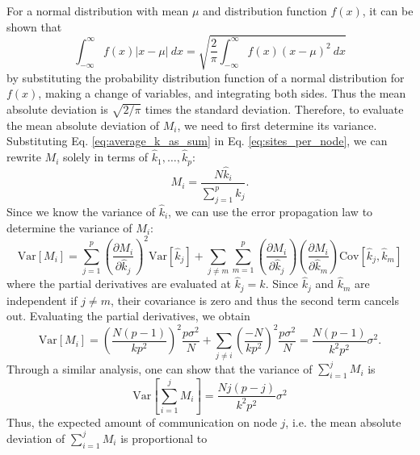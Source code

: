 \documentclass[11pt]{article}
\begin{document}
For a normal distribution with mean $\mu$ and distribution function
$f(x)$, it can be shown that
\begin{equation}
  \int_{-\infty}^{\infty} f(x) \left | x - \mu \right | \: dx =
  \sqrt{\frac{2}{\pi} \int_{-\infty}^{\infty} f(x) \left ( x - \mu
    \right )^2 \: dx}
\end{equation}
by substituting the probability distribution function of a normal
distribution for $f(x)$, making a change of variables, and integrating
both sides. Thus the mean absolute deviation is $\sqrt{2/\pi}$ times
the standard deviation. Therefore, to evaluate the mean absolute
deviation of $M_i$, we need to first determine its
variance. Substituting Eq. \ref{eq:average_k_as_sum} in
Eq. \ref{eq:sites_per_node}, we can rewrite $M_i$ solely in terms of
$\hat{k}_1, \dots, \hat{k}_p$:
\begin{equation}
  M_i = \frac{N \hat{k}_i}{\sum\limits_{j=1}^p \hat{k}_j}.
\end{equation}
Since we know the variance of $\hat{k}_i$, we can use the error
propagation law to determine the variance of $M_i$:
\begin{equation}
  \text{Var} \left [ M_i \right ] = \sum_{j=1}^p \left (
  \frac{\partial M_i}{\partial \hat{k}_j} \right )^2 \text{Var} \left
       [ \hat{k}_j \right ] + \sum\limits_{j \neq m}
       \sum\limits_{m=1}^p \left ( \frac{\partial M_i}{\partial
         \hat{k}_j} \right ) \left ( \frac{\partial M_i}{\partial
         \hat{k}_m} \right ) \text{Cov} \left [ \hat{k}_j, \hat{k}_m
         \right ]
\end{equation}
where the partial derivatives are evaluated at $\hat{k}_j = k$. Since
$\hat{k}_j$ and $\hat{k}_m$ are independent if $j \neq m$, their
covariance is zero and thus the second term cancels out. Evaluating
the partial derivatives, we obtain
\begin{equation}
  \text{Var} \left [ M_i \right ] = \left ( \frac{N(p-1)}{kp^2} \right
  )^2 \frac{p\sigma^2}{N} + \sum_{j \neq i} \left ( \frac{-N}{kp^2}
  \right )^2 \frac{p\sigma^2}{N} = \frac{N(p-1)}{k^2p^2} \sigma^2.
\end{equation}
Through a similar analysis, one can show that the variance of
$\sum_{i=1}^j M_i$ is
\begin{equation}
  \text{Var} \left [ \sum_{i=1}^j M_i \right ] =
  \frac{Nj(p-j)}{k^2p^2} \sigma^2
\end{equation}
Thus, the expected amount of communication on node $j$, i.e. the mean
absolute deviation of $\sum_{i=1}^j M_i$ is proportional to
\end{document}
